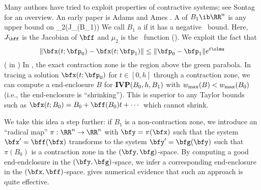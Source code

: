 	Many authors have tried to exploit properties
	of contractive systems;
	see Sontag \cite{sontag:contractive:10} for an overview.
	An early paper is
	Adams and Ames \cite{adams-ames:contracting:78}.
	A  of $B_1\ib \RR^n$ is any upper bound on
		\mu_2(J_\bff(B_1))\as \sup {}
		\eeql
	We call $B_1$ a  if it has a
	negative \lognorm\ bound.
	Here, $J_\bff$ is the Jacobian of $\bff$
	and $\mu_2$ is the \lognorm\ function
	().
	We exploit the fact that
		$$\|\bfx(t;\bfp_0)-\bfx(t;\bfp_1)\|
			\le \|\bfp_0-\bfp_1\| e^{t\olmu}$$
	( in )
	In , the exact contraction zone is the
	region above the green parabola.  In tracing a solution
	$\bfx(t;\bfp_0)$ for $t\in [0,h]$ through a contraction zone,
	we can compute a end-enclosure $B$
	for $\mbox{{\textbf{IVP}}}(B_0,h,B_1)$ with $w_{\max}(B)<w_{\max}(B_0)$
	(i.e., the end-enclosure is ``shrinking'').
	This is superior to any Taylor bounds such as
		$\bfx(t; B_0)= B_0+ \bff(B_0)t + \cdots$
	which cannot shrink.

	We take this idea a step further:
	if $B_1$ is a non-contraction zone,
	we introduce an ``radical map'' $\pi:\RR^n\to\RR^n$
	with $\bfy=\pi(\bfx)$ such that
	the system $\bfx'=\bff(\bfx)$ transforms to
	the system $\bfy'=\bfg(\bfy)$ such that $\pi(B_0)$
	is a contraction zone in the $(\bfy,\bfg)$-space.
	By computing a good end-endclosure in the $(\bfy,\bfg)$-space,
	we infer a corresponding end-enclosure in the $(\bfx,\bff)$-space.
	 gives numerical
	evidence that such an approach is quite effective.





